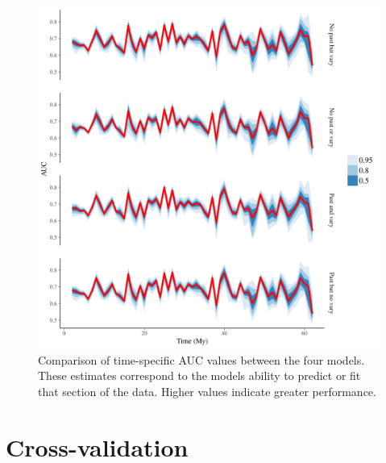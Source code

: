 \documentclass[12pt,letterpaper]{article}
\begin{document}
\begin{figure}[ht]
  \centering
  \includegraphics[width=\textwidth,height=0.5\textheight,keepaspectratio=true]{figure/roc_ts}
  \caption{Comparison of time-specific AUC values between the four models. These estimates correspond to the models ability to predict or fit that section of the data. Higher values indicate greater performance.}
  \label{fig:roc_ts}
\end{figure}


\section{Cross-validation}
\end{document}
